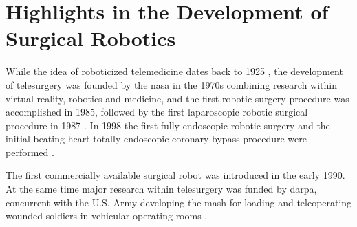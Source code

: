 \section{Highlights in the Development of Surgical Robotics}
While the idea of roboticized telemedicine dates back to 1925 \citep{bib:telemed_predict}, the development of telesurgery was founded by the \gls{nasa} in the 1970s %
combining research within virtual reality, robotics and medicine, %
and the first robotic surgery procedure was accomplished in 1985, %
followed by the first laparoscopic robotic surgical procedure in 1987 \citep{bib:telesurg_history,bib:brown_univ}.
In 1998 the first fully endoscopic robotic surgery and the initial beating-heart totally endoscopic coronary bypass procedure were performed \citep{bib:brown_univ}.



The first commercially available surgical robot was introduced in the early 1990. At the same time major research within telesurgery was funded by \gls{darpa}, %
concurrent with the U.S. Army developing the \gls{mash} for loading and teleoperating wounded soldiers in vehicular operating rooms \citep{bib:telesurg_history,bib:brown_univ}.


